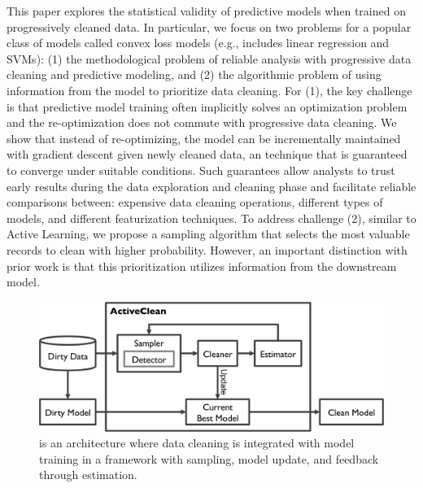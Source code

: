This paper explores the statistical validity of predictive models when trained on progressively cleaned data.
In particular, we focus on two problems for a popular class of models called convex loss models (e.g., includes linear regression and SVMs): (1) the methodological problem of reliable analysis with progressive data cleaning and predictive modeling, and (2) the algorithmic problem of using information from the model to prioritize data cleaning.
For (1), the key challenge is that predictive model training often implicitly solves an optimization problem and the re-optimization does not commute with progressive data cleaning.
We show that instead of re-optimizing, the model can be incrementally maintained with gradient descent given newly cleaned data, an technique that is guaranteed to converge under suitable conditions.
Such guarantees allow analysts to trust early results during the data exploration and cleaning phase and facilitate reliable comparisons between: expensive data cleaning operations, different types of models, and different featurization techniques.
To address challenge (2), similar to Active Learning, we propose a sampling algorithm that selects the most valuable records to clean with higher probability.
However, an important distinction with prior work is that this prioritization utilizes information from the downstream model.

\begin{figure}[t]
\centering
 \includegraphics[width=\columnwidth]{figs/arch.png}
 \caption{\sysfull is an architecture where data cleaning is integrated with model training in a framework with sampling, model update, and feedback through estimation. \label{sys-arch}}\vspace{-2em}
\end{figure}

